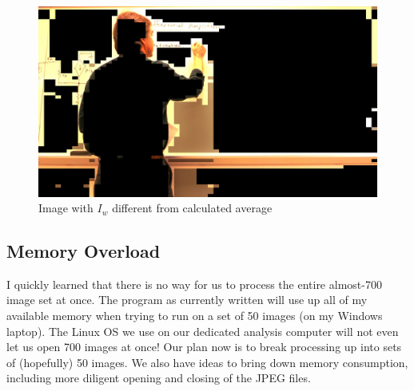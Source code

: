 \documentclass[]{article}
\begin{document}
\begin{figure}[H]
\centering
\includegraphics[scale=0.2]{images/badIw_2}
\caption{Image with $I_w$ different from calculated average}
\end{figure}

	\subsection*{Memory Overload}
	I quickly learned that there is no way for us to process the entire almost-700 image set at once.  The program as currently written will use up all of my available memory when trying to run on a set of 50 images (on my Windows laptop).  The Linux OS we use on our dedicated analysis computer will not even let us open 700 images at once!  Our plan now is to break processing up into sets of (hopefully) 50 images.  We also have ideas to bring down memory consumption, including more diligent opening and closing of the JPEG files.



\end{document}
